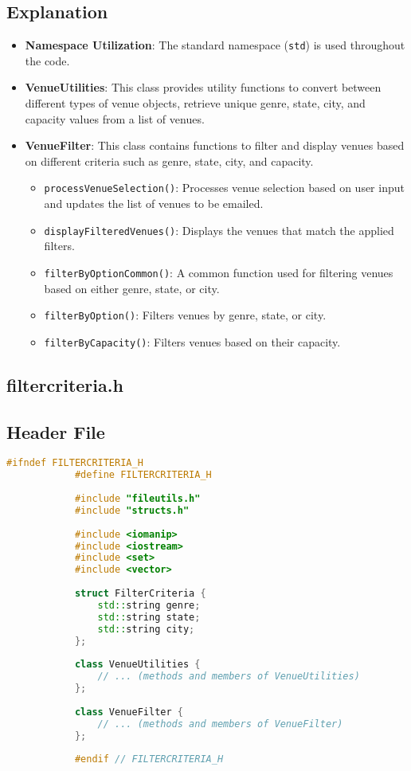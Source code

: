 \documentclass{article}
\begin{document}
	\subsection*{Explanation}
	\begin{itemize}
		\item \textbf{Namespace Utilization}: The standard namespace (\texttt{std}) is used throughout the code.
		\item \textbf{VenueUtilities}: This class provides utility functions to convert between different types of venue objects, retrieve unique genre, state, city, and capacity values from a list of venues.
		\item \textbf{VenueFilter}: This class contains functions to filter and display venues based on different criteria such as genre, state, city, and capacity.
		\begin{itemize}
			\item \texttt{processVenueSelection()}: Processes venue selection based on user input and updates the list of venues to be emailed.
			\item \texttt{displayFilteredVenues()}: Displays the venues that match the applied filters.
			\item \texttt{filterByOptionCommon()}: A common function used for filtering venues based on either genre, state, or city.
			\item \texttt{filterByOption()}: Filters venues by genre, state, or city.
			\item \texttt{filterByCapacity()}: Filters venues based on their capacity.
		\end{itemize}
	\end{itemize}
	
	\subsection{filtercriteria.h}
	
	\subsection*{Header File}
	\begin{mdframed}[backgroundcolor=background, hidealllines=false, innerleftmargin=15pt, innerrightmargin=5pt, innertopmargin=0pt, innerbottommargin=-5pt]
		\begin{lstlisting}[language=C++]
			#ifndef FILTERCRITERIA_H
			#define FILTERCRITERIA_H
			
			#include "fileutils.h"
			#include "structs.h"
			
			#include <iomanip>
			#include <iostream>
			#include <set>
			#include <vector>
			
			struct FilterCriteria {
				std::string genre;
				std::string state;
				std::string city;
			};
			
			class VenueUtilities {
				// ... (methods and members of VenueUtilities)
			};
			
			class VenueFilter {
				// ... (methods and members of VenueFilter)
			};
			
			#endif // FILTERCRITERIA_H
		\end{lstlisting}
	\end{mdframed}
	
\end{document}
